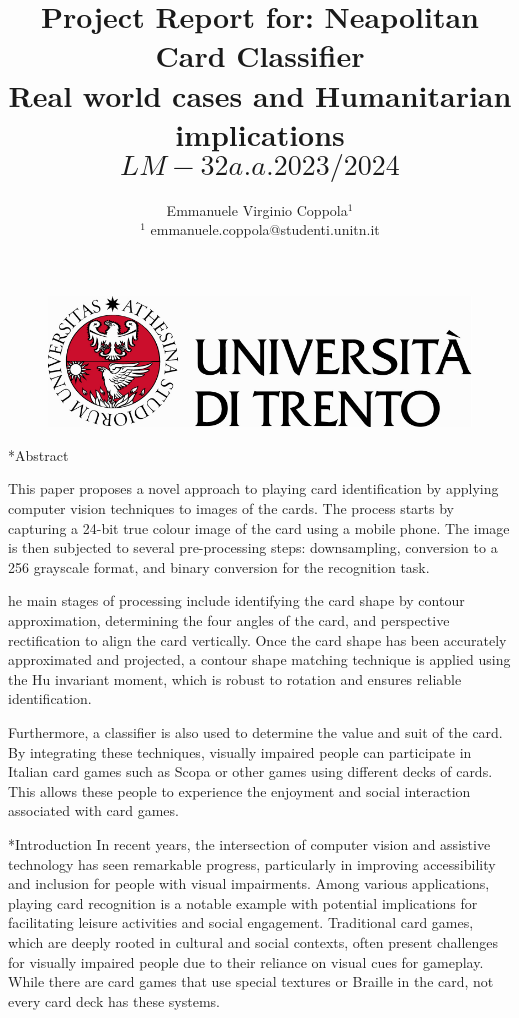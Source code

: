 \documentclass[twocolumn, a4paper,10pt]{article}
\title{%
Project Report for: Neapolitan Card Classifier\\																								%
\vspace{4pt}
Real world cases and Humanitarian implications \[LM-32 a.a. 2023/2024\]
} 																																%
\author{																																														%
Emmanuele Virginio Coppola$^1$\\ 																										%
$^1$ emmanuele.coppola@studenti.unitn.it\\ 																																	%
\phantom{Line 9}} 																																									%
\date{\vspace{-0.5cm}}	%
\makeatletter
\renewcommand\section{\@startsection{section}{1}{\z@}{3pt}{3pt}{\normalfont\large\bfseries}}
\makeatother
\begin{document}
\maketitle
\begin{figure}
  \centering

\includegraphics[scale=0.6]{img/Logo.pdf}
\end{figure}
\section*{Abstract}	%
\addtocounter{section}{1}

This paper proposes a novel approach to playing card identification by applying computer vision techniques to images of the cards. The process starts by capturing a 24-bit true colour image of the card using a mobile phone. The image is then subjected to several pre-processing steps: downsampling, conversion to a 256 grayscale format, and binary conversion for the recognition task.

he main stages of processing include identifying the card shape by contour approximation, determining the four angles of the card, and perspective rectification to align the card vertically. Once the card shape has been accurately approximated and projected, a contour shape matching technique is applied using the Hu invariant moment, which is robust to rotation and ensures reliable identification.

Furthermore, a classifier is also used to determine the value and suit of the card. By integrating these techniques, visually impaired people can participate in Italian card games such as Scopa or other games using different decks of cards. This allows these people to experience the enjoyment and social interaction associated with card games.

\section*{Introduction}
In recent years, the intersection of computer vision and assistive technology has seen remarkable progress, particularly in improving accessibility and inclusion for people with visual impairments. Among various applications, playing card recognition is a notable example with potential implications for facilitating leisure activities and social engagement. Traditional card games, which are deeply rooted in cultural and social contexts, often present challenges for visually impaired people due to their reliance on visual cues for gameplay. While there are card games that use special textures or Braille in the card, not every card deck has these systems.
\end{document}
